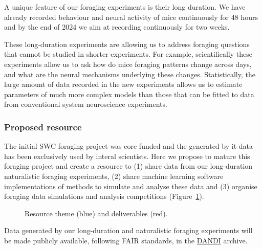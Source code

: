 A unique feature of our foraging experiments is their long duration. We have
already recorded behaviour and neural activity of mice continuously for 48 hours
and by the end of 2024 we aim at recording continuously for two weeks.

These long-duration experiments are allowing us to address foraging questions
that cannot be studied in shorter experiments. For example, scientifically
these experiments allow us to ask how do mice foraging patterns change across
days, and what are the neural mechanisms underlying these changes.
Statistically, the large amount of data recorded in the new experiments allows
us to estimate parameters of much more complex models than those that can be
fitted to data from conventional system neuroscience experiments.



\subsubsection*{Proposed resource}

The initial SWC foraging project was core funded and the generated by it data
has been exclusively used by interal scientists. Here we propose to mature this
foraging project and create a resource to (1) share data from our long-duration
naturalistic foraging experiments, (2) share machine learning software
implementations of methods to simulate and analyse these data and (3) organise
foraging data simulations and analysis competitions
(Figure~\ref{fig:resource}).

\begin{figure}
    \begin{center}
        
    \end{center}
    \caption{Resource theme (blue) and deliverables (red).}
    \label{fig:resource}
\end{figure}

Data generated by our long-duration and naturalistic foraging experiments will
be made publicly available, following FAIR standards, in the
\href{https://dandiarchive.org/}{DANDI} archive.

